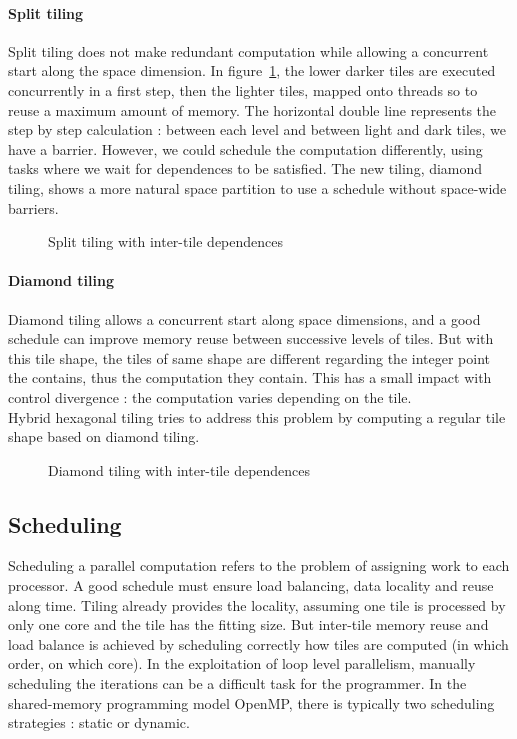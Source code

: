 \documentclass[a4paper,11pt]{article}
\begin{document}
 \paragraph{Split tiling} Split tiling \cite{grosser_split_2013} does not make redundant computation while allowing a concurrent 
 start along the space dimension. In figure~\ref{split-tiling}, the lower darker tiles are executed
concurrently in a first step, then the lighter tiles, mapped onto threads so to reuse a
maximum amount of memory. The horizontal double line represents the step by step calculation : 
between each level and between light and dark tiles, we have a barrier. However,
we could schedule the computation differently, using tasks where we wait for dependences
to be satisfied. The new tiling, diamond tiling, shows a more natural space partition to
use a schedule without space-wide barriers.
  \begin{figure}[h]
   
   \caption{Split tiling with inter-tile dependences}
   \label{split-tiling}
  \end{figure}
  
  \paragraph{Diamond tiling}
  Diamond tiling \cite{bandishti_tiling_2012} allows a concurrent start along space dimensions,
  and a good schedule can improve memory reuse between successive levels of tiles. But with this
  tile shape, the tiles of same shape are different regarding the integer point the contains, thus
  the computation they contain. This has a small impact with control divergence : the computation 
  varies depending on the tile. \\
  Hybrid hexagonal tiling \cite{grosser_relation_2014} tries to address this problem by computing
  a regular tile shape based on diamond tiling.
   \begin{figure}[h]
   
   \caption{Diamond tiling with inter-tile dependences}
   \label{diam-tiling}
  \end{figure}
  
 
\subsection{Scheduling}
Scheduling a parallel computation refers to the problem of assigning work to each processor. 
A good schedule must ensure load balancing, data locality and reuse along time.
Tiling already provides the locality, assuming one tile is processed by only one core and
the tile has the fitting size. But inter-tile memory reuse and load balance is achieved by
scheduling correctly how tiles are computed (in which order, on which core).
In the exploitation of loop level parallelism, manually scheduling the iterations can be a
difficult task for the programmer. In the shared-memory programming model OpenMP,
there is typically two scheduling strategies : static or dynamic. \\
\end{document}
